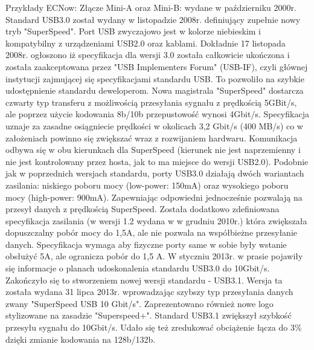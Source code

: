 \documentclass{BscUS}
\begin{document}
\newline
Przykłady ECNow:
Złącze Mini-A oraz Mini-B: wydane w październiku 2000r.\cite{USB20Doc}
\newline
\indent Standard USB3.0 został wydany w listopadzie 2008r. definiujący zupełnie nowy tryb "SuperSpeed". Port USB zwyczajowo jest w kolorze niebieskim i kompatybilny z urządzeniami USB2.0 oraz kablami.
Dokładnie 17 listopada 2008r. ogłoszono iż specyfikacja dla wersji 3.0 została całkowicie ukończona i została zaakceptowana przez "USB Implementers Forum" (USB-IF), czyli głównej instytucji zajmującej się specyfikacjami standardu USB. To pozwoliło na szybkie udostępnienie standardu deweloperom.
Nowa magistrala "SuperSpeed" dostarcza czwarty typ transferu z możliwością przesyłania sygnału z prędkością 5GBit/s, ale poprzez użycie kodowania 8b/10b przepustowość wynosi 4Gbit/s. Specyfikacja uznaje za zasadne osiągniecie prędkości w okolicach 3,2 Gbit/s (400 MB/s) co w założeniach powinno się zwiększać wraz z rozwijaniem hardwaru. Komunikacja odbywa się w obu kierunkach dla SuperSpeed (kierunek nie jest naprzemienny i nie jest kontrolowany przez hosta, jak to ma miejsce do wersji USB2.0).
Podobnie jak w poprzednich wersjach standardu, porty USB3.0 działają dwóch wariantach zasilania: niskiego poboru mocy (low-power: 150mA) oraz wysokiego poboru mocy (high-power: 900mA). Zapewniając odpowiedni jednocześnie pozwalają na przesył danych z prędkością SuperSpeed.
Została dodatkowo zdefiniowana specyfikacja zasilania (w wersji 1.2 wydana w w grudniu 2010r.) która zwiększała dopuszczalny pobór mocy do 1,5A, ale nie pozwala na współbieżne przesyłanie danych. Specyfikacja wymaga aby fizyczne porty same w sobie były wstanie obsłużyć 5A, ale ogranicza pobór do 1,5 A.
\cite{USB30Doc}
\newline
\indent W styczniu 2013r. w prasie pojawiły się informacje o planach udoskonalenia standardu USB3.0 do 10Gbit/s. Zakończyło się to stworzeniem nowej wersji standardu - USB3.1. Wersja ta została wydana 31 lipca 2013r. wprowadzając szybszy typ przesyłania danych zwany "SuperSpeed USB 10 Gbit/s". Zaprezentowano również nowe logo stylizowane na zasadzie "Superspeed+". Standard USB3.1 zwiększył szybkość przesyłu sygnału do 10Gbit/s. Udało się też zredukować obciążenie łącza do 3\% dzięki zmianie kodowania na 128b/132b.
\end{document}
